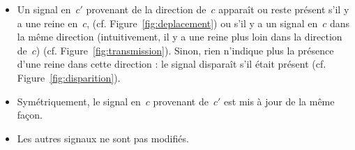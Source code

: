 \documentclass[11pt, openany, a4paper]{article}
\begin{document}
 \begin{itemize} 

\item{%
Un signal en~$c'$ provenant de la direction de~$c$ apparaît ou reste présent s'il y a une reine en~$c$, (cf. Figure~\ref{fig:deplacement}) ou s'il y a un signal en~$c$ dans la même direction (intuitivement, il y a une reine plus loin dans la direction de~$c$) (cf. Figure~\ref{fig:transmission}). Sinon, rien n'indique plus la présence d'une reine dans cette direction : le signal disparaît s'il était présent (cf. Figure~\ref{fig:disparition}). }

\item{ Symétriquement, le signal en~$c$ provenant de~$c'$ est mis à jour de la même façon.}

\item{ Les autres signaux ne sont pas modifiés. }
  


\end{itemize}
\end{document}
